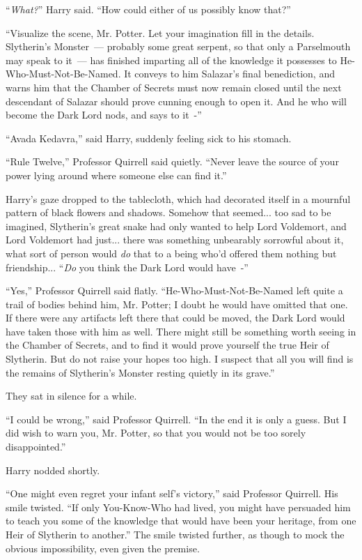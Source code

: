 ``\emph{What?}'' Harry said. ``How could either of us possibly know that?''

``Visualize the scene, Mr. Potter. Let your imagination fill in the details. Slytherin's Monster~--- probably some great serpent, so that only a Parselmouth may speak to it~--- has finished imparting all of the knowledge it possesses to He-Who-Must-Not-Be-Named. It conveys to him Salazar's final benediction, and warns him that the Chamber of Secrets must now remain closed until the next descendant of Salazar should prove cunning enough to open it. And he who will become the Dark Lord nods, and says to it~-''

``Avada Kedavra,'' said Harry, suddenly feeling sick to his stomach.

``Rule Twelve,'' Professor Quirrell said quietly. ``Never leave the source of your power lying around where someone else can find it.''

Harry's gaze dropped to the tablecloth, which had decorated itself in a mournful pattern of black flowers and shadows. Somehow that seemed... too sad to be imagined, Slytherin's great snake had only wanted to help Lord Voldemort, and Lord Voldemort had just... there was something unbearably sorrowful about it, what sort of person would \emph{do} that to a being who'd offered them nothing but friendship... ``\emph{Do} you think the Dark Lord would have~-''

``Yes,'' Professor Quirrell said flatly. ``He-Who-Must-Not-Be-Named left quite a trail of bodies behind him, Mr. Potter; I doubt he would have omitted that one. If there were any artifacts left there that could be moved, the Dark Lord would have taken those with him as well. There might still be something worth seeing in the Chamber of Secrets, and to find it would prove yourself the true Heir of Slytherin. But do not raise your hopes too high. I suspect that all you will find is the remains of Slytherin's Monster resting quietly in its grave.''

They sat in silence for a while.

``I could be wrong,'' said Professor Quirrell. ``In the end it is only a guess. But I did wish to warn you, Mr. Potter, so that you would not be too sorely disappointed.''

Harry nodded shortly.

``One might even regret your infant self's victory,'' said Professor Quirrell. His smile twisted. ``If only You-Know-Who had lived, you might have persuaded him to teach you some of the knowledge that would have been your heritage, from one Heir of Slytherin to another.'' The smile twisted further, as though to mock the obvious impossibility, even given the premise.

